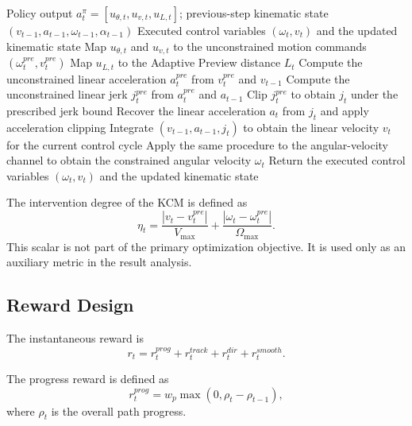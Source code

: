\documentclass[preprint,12pt]{elsarticle}
\begin{document}
\begin{algorithm}[H]
\caption{KCM-constrained action projection}
\label{alg:kcm_projection}
\begin{algorithmic}[1]
\Require Policy output $a_t^{\pi}=[u_{\theta,t},u_{v,t},u_{L,t}]$; previous-step kinematic state $(v_{t-1},a_{t-1},\omega_{t-1},\alpha_{t-1})$
\Ensure Executed control variables $(\omega_t,v_t)$ and the updated kinematic state
\State Map $u_{\theta,t}$ and $u_{v,t}$ to the unconstrained motion commands $(\omega_t^{pre},v_t^{pre})$
\State Map $u_{L,t}$ to the Adaptive Preview distance $L_t$
\State Compute the unconstrained linear acceleration $a_t^{pre}$ from $v_t^{pre}$ and $v_{t-1}$
\State Compute the unconstrained linear jerk $j_t^{pre}$ from $a_t^{pre}$ and $a_{t-1}$
\State Clip $j_t^{pre}$ to obtain $j_t$ under the prescribed jerk bound
\State Recover the linear acceleration $a_t$ from $j_t$ and apply acceleration clipping
\State Integrate $(v_{t-1},a_{t-1},j_t)$ to obtain the linear velocity $v_t$ for the current control cycle
\State Apply the same procedure to the angular-velocity channel to obtain the constrained angular velocity $\omega_t$
\State Return the executed control variables $(\omega_t,v_t)$ and the updated kinematic state
\end{algorithmic}
\end{algorithm}

The intervention degree of the KCM is defined as
\begin{equation}
\eta_t=\frac{|v_t-v_t^{pre}|}{V_{\max}}+\frac{|\omega_t-\omega_t^{pre}|}{\Omega_{\max}}.
\end{equation}
This scalar is not part of the primary optimization objective. It is used only as an auxiliary metric in the result analysis.

\subsection{Reward Design}
The instantaneous reward is
\begin{equation}
r_t=r_t^{prog}+r_t^{track}+r_t^{dir}+r_t^{smooth}.
\label{eq:reward_total}
\end{equation}

The progress reward is defined as
\begin{equation}
r_t^{prog}=w_p\max(0,\rho_t-\rho_{t-1}),
\end{equation}
where $\rho_t$ is the overall path progress.
\end{document}

